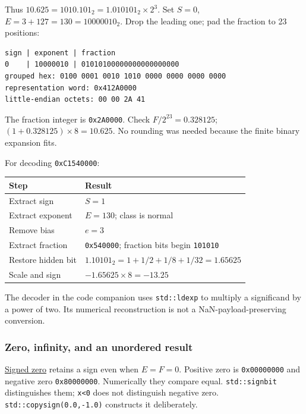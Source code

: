 Thus \(10.625=1010.101_2=1.010101_2\times2^3\). Set \(S=0\), \(E=3+127=130=10000010_2\). Drop the leading one; pad the fraction to 23 positions:

\begin{verbatim}
sign | exponent | fraction
0    | 10000010 | 01010100000000000000000
grouped hex: 0100 0001 0010 1010 0000 0000 0000 0000
representation word: 0x412A0000
little-endian octets: 00 00 2A 41
\end{verbatim}

The fraction integer is \texttt{0x2A0000}. Check \(F/2^{23}=0.328125\); \((1+0.328125)\times8=10.625\). No rounding was needed because the finite binary expansion fits.

For decoding \texttt{0xC1540000}:

{\def\LTcaptype{none} %
\begin{longtable}[]{@{}ll@{}}
\toprule\noalign{}
Step & Result \\
\midrule\noalign{}
\endhead
\bottomrule\noalign{}
\endlastfoot
Extract sign & \(S=1\) \\
Extract exponent & \(E=130\); class is normal \\
Remove bias & \(e=3\) \\
Extract fraction & \texttt{0x540000}; fraction bits begin \texttt{101010} \\
Restore hidden bit & \(1.10101_2=1+1/2+1/8+1/32=1.65625\) \\
Scale and sign & \(-1.65625\times8=-13.25\) \\
\end{longtable}
}

The decoder in the code companion uses \texttt{std::ldexp} to multiply a significand by a power of two. Its numerical reconstruction is not a NaN-payload-preserving conversion.

\subsubsection{Zero, infinity, and an unordered result}\label{05-engine-i-ch001-zero-infinity-and-an-unordered-result}

\hyperref[appendix-3a048f032c1f]{Signed zero} retains a sign even when \(E=F=0\). Positive zero is \texttt{0x00000000} and negative zero \texttt{0x80000000}. Numerically they compare equal. \texttt{std::signbit} distinguishes them; \texttt{x\textless{}0} does not distinguish negative zero. \texttt{std::copysign(0.0,-1.0)} constructs it deliberately.

